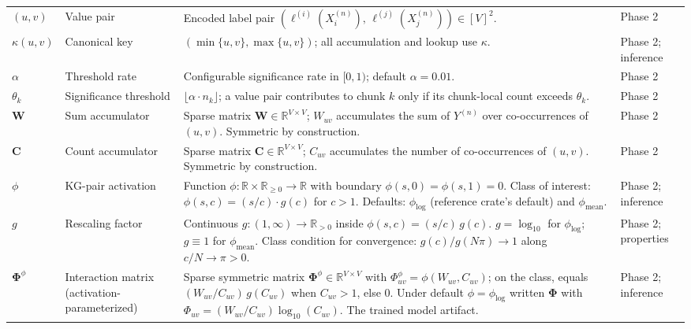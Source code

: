 \documentclass[10pt]{article}
\begin{document}
\begin{center}
\begin{longtable}{@{} L{1.6cm} L{3.2cm} L{5.8cm} L{3.8cm} @{}}
$(u,v)$ & Value pair & Encoded label pair $(\ell^{(i)}(X_i^{(n)}),\, \ell^{(j)}(X_j^{(n)})) \in [V]^2$. & Phase 2 \\[4pt]

$\kappa(u,v)$ & Canonical key & $(\min\{u,v\}, \max\{u,v\})$; all accumulation and lookup use $\kappa$. & Phase 2; inference \\[4pt]

$\alpha$ & Threshold rate & Configurable significance rate in $[0,1)$; default $\alpha = 0.01$. & Phase 2 \\[4pt]

$\theta_k$ & Significance threshold & $\lfloor \alpha \cdot n_k \rfloor$; a value pair contributes to chunk $k$ only if its chunk-local count exceeds $\theta_k$. & Phase 2 \\[4pt]

$\bm{W}$ & Sum accumulator & Sparse matrix $\bm{W} \in \mathbb{R}^{V \times V}$; $W_{uv}$ accumulates the sum of $Y^{(n)}$ over co-occurrences of $(u,v)$. Symmetric by construction. & Phase 2 \\[4pt]

$\bm{C}$ & Count accumulator & Sparse matrix $\bm{C} \in \mathbb{R}^{V \times V}$; $C_{uv}$ accumulates the number of co-occurrences of $(u,v)$. Symmetric by construction. & Phase 2 \\[4pt]

$\phi$ & KG-pair activation & Function $\phi:\mathbb{R}\times\mathbb{R}_{\ge 0}\to\mathbb{R}$ with boundary $\phi(s,0)=\phi(s,1)=0$. Class of interest: $\phi(s,c)=(s/c)\cdot g(c)$ for $c>1$. Defaults: $\phi_{\log}$ (reference crate's default) and $\phi_{\mathrm{mean}}$. & Phase 2; inference \\[4pt]

$g$ & Rescaling factor & Continuous $g:(1,\infty)\to\mathbb{R}_{>0}$ inside $\phi(s,c)=(s/c)\,g(c)$. $g=\log_{10}$ for $\phi_{\log}$; $g\equiv 1$ for $\phi_{\mathrm{mean}}$. Class condition for convergence: $g(c)/g(N\pi)\to 1$ along $c/N\to\pi>0$. & Phase 2; properties \\[4pt]

$\bm{\Phi}^\phi$ & Interaction matrix (activation-parameterized) & Sparse symmetric matrix $\bm{\Phi}^\phi\in\mathbb{R}^{V\times V}$ with $\Phi^\phi_{uv}=\phi(W_{uv},C_{uv})$; on the class, equals $(W_{uv}/C_{uv})\,g(C_{uv})$ when $C_{uv}>1$, else $0$. Under default $\phi=\phi_{\log}$ written $\bm{\Phi}$ with $\Phi_{uv}=(W_{uv}/C_{uv})\log_{10}(C_{uv})$. The trained model artifact. & Phase 2; inference \\[4pt]


\end{longtable}
\end{center}
\end{document}
